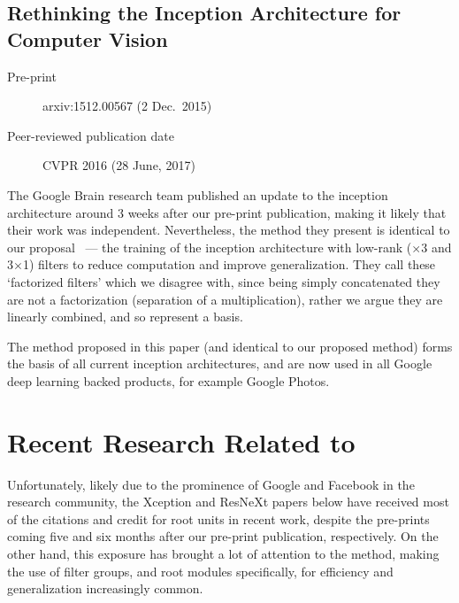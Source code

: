 \documentclass[thesis]{subfiles}
\begin{document}
\subsection*{Rethinking the Inception Architecture for Computer Vision}
\begin{description}
    \item[Pre-print] arxiv:1512.00567 (2 Dec.\ 2015)
    \item[Peer-reviewed publication date] CVPR 2016 (28 June, 2017)
\end{description}
The Google Brain research team published an update to the \Gls{inception} architecture around 3 weeks after our pre-print publication, making it likely that their work was independent. Nevertheless, the method they present is identical to our proposal~\citep{Ioannou2016} --- the training of the \Gls{inception} architecture with low-rank ($\times$3 and 3$\times$1) filters to reduce computation and improve generalization. They call these `factorized filters' which we disagree with, since being simply concatenated they are not a factorization (\ie separation of a multiplication), rather we argue they are linearly combined, and so represent a basis.

The method proposed in this paper (and identical to our proposed method) forms the basis of all current \Gls{inception} architectures, and are now used in all Google deep learning backed products, for example Google Photos\texttrademark.

\section{Recent Research Related to }
Unfortunately, likely due to the prominence of Google and Facebook in the research community, the Xception and ResNeXt papers below have received most of the citations and credit for root units in recent work, despite the pre-prints coming five and six months after our pre-print publication, respectively. On the other hand, this exposure has brought a lot of attention to the method, making the use of filter groups, and root modules specifically, for efficiency and generalization increasingly common. 
\end{document}
